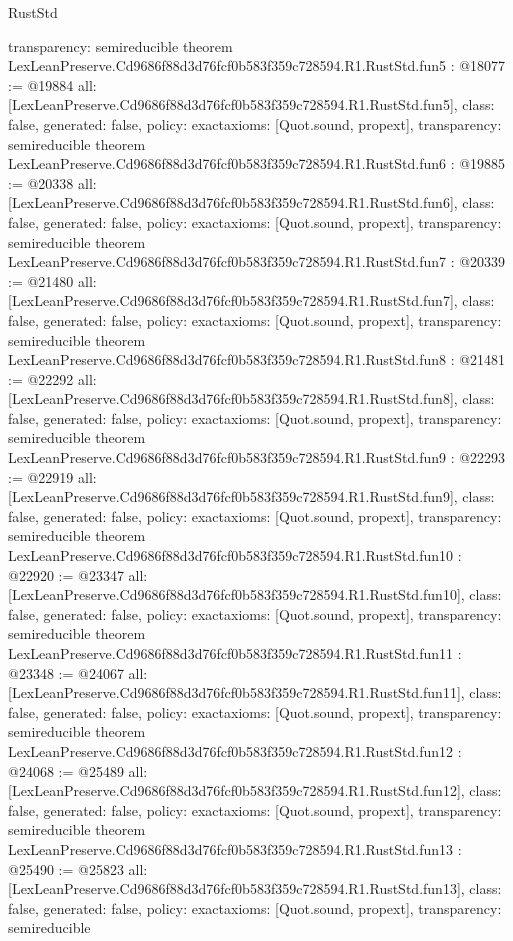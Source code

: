 \begin{lexlean}{RustStd}
\begin{coremodule}
{  transparency: semireducible
}
theorem LexLeanPreserve.Cd9686f88d3d76fcf0b583f359c728594.R1.RustStd.fun5 : @18077 := @19884 {
  all: [LexLeanPreserve.Cd9686f88d3d76fcf0b583f359c728594.R1.RustStd.fun5],
  class: false,
  generated: false,
  policy: exact{axioms: [Quot.sound, propext]},
  transparency: semireducible
}
theorem LexLeanPreserve.Cd9686f88d3d76fcf0b583f359c728594.R1.RustStd.fun6 : @19885 := @20338 {
  all: [LexLeanPreserve.Cd9686f88d3d76fcf0b583f359c728594.R1.RustStd.fun6],
  class: false,
  generated: false,
  policy: exact{axioms: [Quot.sound, propext]},
  transparency: semireducible
}
theorem LexLeanPreserve.Cd9686f88d3d76fcf0b583f359c728594.R1.RustStd.fun7 : @20339 := @21480 {
  all: [LexLeanPreserve.Cd9686f88d3d76fcf0b583f359c728594.R1.RustStd.fun7],
  class: false,
  generated: false,
  policy: exact{axioms: [Quot.sound, propext]},
  transparency: semireducible
}
theorem LexLeanPreserve.Cd9686f88d3d76fcf0b583f359c728594.R1.RustStd.fun8 : @21481 := @22292 {
  all: [LexLeanPreserve.Cd9686f88d3d76fcf0b583f359c728594.R1.RustStd.fun8],
  class: false,
  generated: false,
  policy: exact{axioms: [Quot.sound, propext]},
  transparency: semireducible
}
theorem LexLeanPreserve.Cd9686f88d3d76fcf0b583f359c728594.R1.RustStd.fun9 : @22293 := @22919 {
  all: [LexLeanPreserve.Cd9686f88d3d76fcf0b583f359c728594.R1.RustStd.fun9],
  class: false,
  generated: false,
  policy: exact{axioms: [Quot.sound, propext]},
  transparency: semireducible
}
theorem LexLeanPreserve.Cd9686f88d3d76fcf0b583f359c728594.R1.RustStd.fun10 : @22920 := @23347 {
  all: [LexLeanPreserve.Cd9686f88d3d76fcf0b583f359c728594.R1.RustStd.fun10],
  class: false,
  generated: false,
  policy: exact{axioms: [Quot.sound, propext]},
  transparency: semireducible
}
theorem LexLeanPreserve.Cd9686f88d3d76fcf0b583f359c728594.R1.RustStd.fun11 : @23348 := @24067 {
  all: [LexLeanPreserve.Cd9686f88d3d76fcf0b583f359c728594.R1.RustStd.fun11],
  class: false,
  generated: false,
  policy: exact{axioms: [Quot.sound, propext]},
  transparency: semireducible
}
theorem LexLeanPreserve.Cd9686f88d3d76fcf0b583f359c728594.R1.RustStd.fun12 : @24068 := @25489 {
  all: [LexLeanPreserve.Cd9686f88d3d76fcf0b583f359c728594.R1.RustStd.fun12],
  class: false,
  generated: false,
  policy: exact{axioms: [Quot.sound, propext]},
  transparency: semireducible
}
theorem LexLeanPreserve.Cd9686f88d3d76fcf0b583f359c728594.R1.RustStd.fun13 : @25490 := @25823 {
  all: [LexLeanPreserve.Cd9686f88d3d76fcf0b583f359c728594.R1.RustStd.fun13],
  class: false,
  generated: false,
  policy: exact{axioms: [Quot.sound, propext]},
  transparency: semireducible
}
\end{coremodule}
\end{lexlean}
